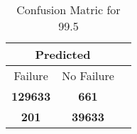 \begin{table}[] 
\caption{Confusion Matric for 99.5} 
\label{Table: Prediction Accuracy-DMD99.5OnlySunEKF-resetReflection-Reflection} 
\centering 
\begin{tabular} 
 {@{}ccc@{}} 
\toprule 
\multicolumn{2}{c}{\textbf{Predicted}}
 \\ \midrule 
\multicolumn{1}{|c|}{Failure} & 
\multicolumn{1}{c|}{No Failure}
 \\ \midrule 
\multicolumn{1}{|c|}{\color{green}\textbf{129633}} & 
\multicolumn{1}{c|}{\color{red}\textbf{661}}
 \\ \midrule 
\multicolumn{1}{|c|}{\color{red}\textbf{201}} & 
\multicolumn{1}{c|}{\color{green}\textbf{39633}}
 \\ \bottomrule 
\end{tabular} 
\end{table} 
